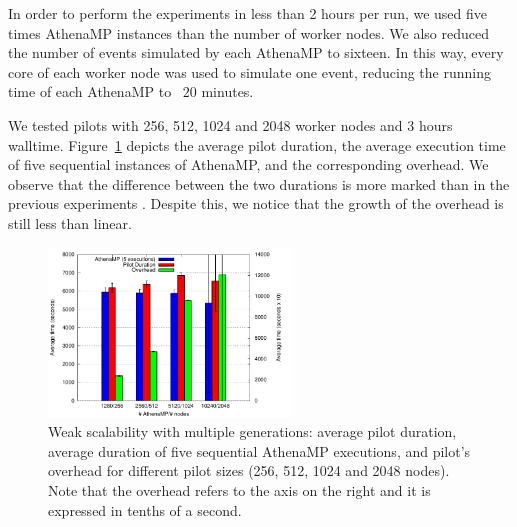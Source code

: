 In order to perform the experiments in less than 2 hours per run, we
used five times AthenaMP instances than the number of worker nodes. %
We also reduced  the number of events
simulated by each AthenaMP to sixteen.
In this way, every core of each worker node was used to simulate one event,
reducing the running time of each AthenaMP to ~$20$ minutes. %

We tested
pilots
with 256, 512, 1024 and 2048 worker nodes and
3 hours walltime. Figure~\ref{fig:weakScal2a} depicts the average
pilot duration, the average execution time of five sequential
instances of AthenaMP, and the corresponding overhead. We
observe that the difference between the two durations is more marked than in the
previous experiments . Despite
this, we
notice that the growth of the overhead is still less than linear.

\begin{figure}[!htb]
        \includegraphics[height=4.5cm,width=\columnwidth]{./figures/NGE/weak2.pdf}
    \caption{Weak scalability with multiple generations: average pilot
    duration, average duration of five sequential AthenaMP executions, and
    pilot's overhead for different pilot sizes (256, 512, 1024 and 2048 nodes).
    Note that the overhead refers to the axis on the right and it is expressed
    in tenths of a second.}
\label{fig:weakScal2a}
\end{figure}



